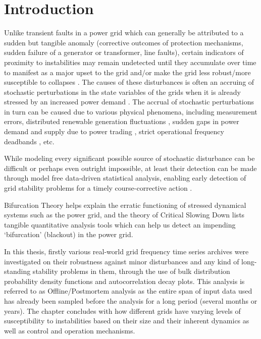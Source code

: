 \section[Introduction]{Introduction}
\label{sec:intro}

Unlike transient faults in a power grid which can generally be attributed to a sudden but tangible anomaly (corrective outcomes of protection mechanisms, sudden failure of a generator or transformer, line faults), certain indicators of proximity to instabilities may remain undetected until they accumulate over time to manifest as a major upset to the grid \cite{entsoeReportGridCollapseContinentalEurope2021Jan} and/or make the grid less robust/more susceptible to collapses \cite{schafer01}. The causes of these disturbances is often an accruing of stochastic perturbations in the state variables of the grids when it is already stressed by an increased power demand \cite{rosehartBifurcationAnalysisOfVariousPowerSystemModels}.  The accrual of stochastic perturbations in turn can be caused due to various physical phenomena, including measurement errors, distributed renewable generation fluctuations \cite{adeen01}, sudden gaps in power demand and supply due to power trading \cite{schafer01}, strict operational frequency deadbands \cite{vorobev01, francesca01}, etc.
 
While modeling every significant possible source of stochastic disturbance can be difficult or perhaps even outright impossible, at least their detection can be made through model free data-driven statistical analysis, enabling early detection of grid stability problems for a timely course-corrective action \cite{schafer01, sanchez01, ghanvati01}.

Bifurcation Theory \cite{nathanKutzNotesOnBifurcationTheoryAndNormalForms, rosehartBifurcationAnalysisOfVariousPowerSystemModels, chenBifurcationsAndChaosInEngineering, mohlerDyanmicsAndControlPartOne} helps explain the erratic functioning of stressed dynamical systems such as the power grid, and the theory of Critical Slowing Down \cite{schefferEarlyWarningSignalsForCriticalTransitions} lists tangible quantitative analysis tools which can help us detect an impending `bifurcation' (blackout) in the power grid.

In this thesis, firstly various real-world grid frequency time series archives were investigated on their robustness against minor disturbances and any kind of long-standing stability problems in them, through the use of bulk distribution probability density functions and autocorrelation decay plots. This analysis is referred to as Offline/Postmortem analysis as the entire span of input data used has already been sampled before the analysis for a long period (several months or years). The chapter concludes with how different grids have varying levels of susceptibility to instabilities based on their size and their inherent dynamics as well as control and operation mechanisms. 


